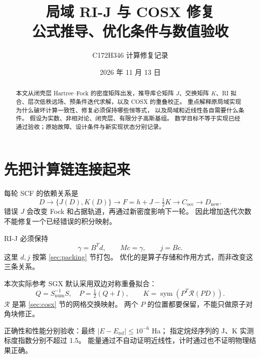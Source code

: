 \documentclass[UTF8,fontset=fandol,11pt,a4paper]{ctexart}
\title{局域 RI-J 与 COSX 修复\\公式推导、优化条件与数值验收}
\author{C172H346 计算修复记录}
\date{2026 年 11 月 13 日}
\numberwithin{equation}{section}
\newcommand{\sym}{\operatorname{sym}}
\begin{document}
\maketitle

\begin{abstract}
本文从闭壳层 Hartree--Fock 的密度矩阵出发，推导库仑矩阵 \(J\)、交换矩阵
\(K\)、RI 拟合、层次低秩远场、预条件迭代求解，以及 COSX 的重叠校正。
重点解释原局域实现为什么破坏计算一致性、修复必须保持哪些恒等式，
以及局域和近线性各自需要什么条件。
假设为实数、非相对论、闭壳层、有限分子高斯基组。
数学目标不等于实现已经通过验收；原始故障、设计条件与新实现状态分别记录。
\end{abstract}
\tableofcontents
\newpage

\section{先把计算链连接起来}
\label{sec:roadmap}
每轮 SCF 的依赖关系是
\begin{equation}
D\longrightarrow\{J(D),K(D)\}\longrightarrow F=h+J-\tfrac12K
\longrightarrow C_{\mathrm{occ}}\longrightarrow D_{\mathrm{new}}.
\label{eq:flow}
\end{equation}
错误 \(J\) 会改变 Fock 和占据轨道，再通过新密度影响下一轮。
因此增加迭代次数不能修复一个已经错误的积分映射。

RI-J 必须保持
\begin{equation}
\boxed{\gamma=B^Td,\qquad Mc=\gamma,\qquad j=Bc.}
\label{eq:roadJ}
\end{equation}
这里 \(d,j\) 按第 \ref{sec:packing} 节打包。
优化的是算子存储和作用方式，而非改变这三条关系。

本次实际参考 SGX 默认采用双边对称重叠拟合：
\begin{equation}
Q=S_{\mathrm{num}}^{-1}S,\quad P=\tfrac12(Q+I),\qquad
\boxed{K=\sym\!\left(P^T\mathcal R(PD)\right).}
\label{eq:roadK}
\end{equation}
\(\mathcal R\) 是第 \ref{sec:cosx} 节的网格交换映射。
两个 \(P\) 的位置都要保留，不能只做原子对角块修正。

正确性和性能分别验收：最终
\(|E-E_{\mathrm{ref}}|\leq10^{-6}\) Ha；
指定烷烃序列的 J、K 实测标度指数分别不超过 1.5。
能量通过不自动证明近线性，计时通过也不证明物理结果正确。
\end{document}
